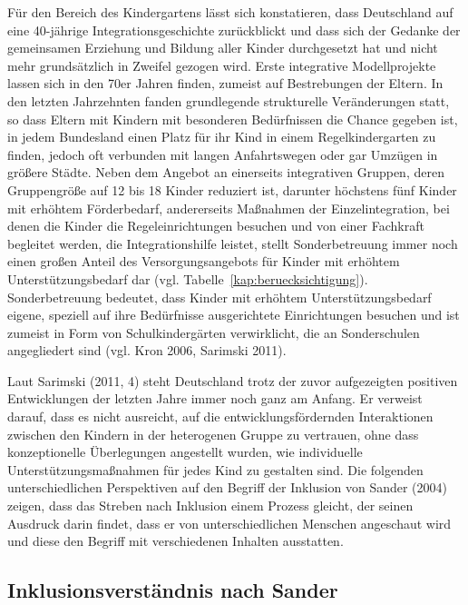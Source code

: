 Für den Bereich des Kindergartens lässt sich konstatieren, dass Deutschland auf eine 40-jährige Integrationsgeschichte zurückblickt und dass sich der Gedanke der gemeinsamen Erziehung und Bildung aller Kinder durchgesetzt hat und nicht mehr grundsätzlich in Zweifel gezogen wird. Erste integrative Modellprojekte lassen sich in den 70er Jahren finden, zumeist auf Bestrebungen der Eltern. In den letzten Jahrzehnten fanden grundlegende strukturelle Veränderungen statt, so dass Eltern mit Kindern mit besonderen Bedürfnissen die Chance gegeben ist, in jedem Bundesland einen Platz für ihr Kind in einem Regelkindergarten zu finden, jedoch oft verbunden mit langen Anfahrtswegen oder gar Umzügen in größere Städte. Neben dem Angebot an einerseits integrativen Gruppen, deren Gruppengröße auf 12 bis 18 Kinder reduziert ist, darunter höchstens fünf Kinder mit erhöhtem Förderbedarf, andererseits Maßnahmen der Einzelintegration, bei denen die Kinder die Regeleinrichtungen besuchen und von einer Fachkraft begleitet werden, die Integrationshilfe leistet, stellt Sonderbetreuung immer noch einen großen Anteil des Versorgungsangebots für Kinder mit erhöhtem Unterstützungsbedarf dar (vgl. Tabelle~\ref{kap:beruecksichtigung}). Sonderbetreuung bedeutet, dass Kinder mit erhöhtem Unterstützungsbedarf eigene, speziell auf ihre Bedürfnisse 
ausgerichtete Einrichtungen besuchen und ist zumeist in Form von Schulkindergärten verwirklicht, die an Sonderschulen angegliedert sind (vgl. Kron 2006, Sarimski 2011).

Laut Sarimski (2011, 4) steht Deutschland trotz der zuvor aufgezeigten positiven Entwicklungen der letzten Jahre immer noch ganz am Anfang. Er verweist darauf, dass es nicht ausreicht, auf die entwicklungsfördernden Interaktionen zwischen den Kindern in der heterogenen Gruppe zu vertrauen, ohne dass konzeptionelle Überlegungen angestellt wurden, wie individuelle Unterstützungsmaßnahmen für jedes Kind zu gestalten sind. Die folgenden unterschiedlichen Perspektiven auf den Begriff der Inklusion von Sander (2004) zeigen, dass das Streben nach Inklusion einem Prozess gleicht, der seinen Ausdruck darin findet, dass er von unterschiedlichen Menschen angeschaut wird und diese den Begriff mit verschiedenen Inhalten ausstatten. 


\subsection{Inklusionsverständnis nach Sander} 


